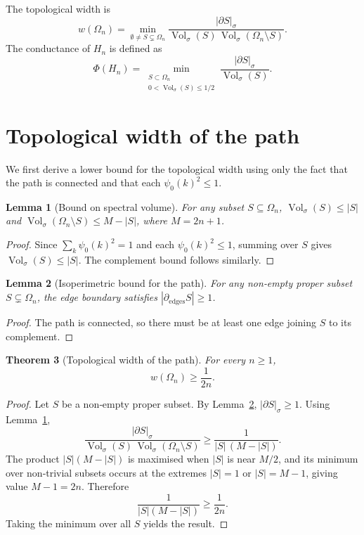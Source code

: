 \documentclass[11pt,a4paper]{article}
\newtheorem{theorem}{Theorem}[section]
\newtheorem{lemma}[theorem]{Lemma}
\begin{document}
The topological width is
\[
w(\Omega_n) = \min_{\emptyset\neq S\subsetneq\Omega_n} \frac{|\partial S|_\sigma}{\operatorname{Vol}_\sigma(S)\,\operatorname{Vol}_\sigma(\Omega_n\setminus S)}.
\]
The conductance of $H_n$ is defined as
\[
\Phi(H_n) = \min_{\substack{S\subset\Omega_n\\0<\operatorname{Vol}_\sigma(S)\le 1/2}} \frac{|\partial S|_\sigma}{\operatorname{Vol}_\sigma(S)}.
\]

\section{Topological width of the path}

We first derive a lower bound for the topological width using only the fact that the path is connected and that each $\psi_0(k)^2 \le 1$.

\begin{lemma}[Bound on spectral volume]\label{lem:vol}
For any subset $S\subseteq\Omega_n$, $\operatorname{Vol}_\sigma(S) \le |S|$ and $\operatorname{Vol}_\sigma(\Omega_n\setminus S) \le M - |S|$, where $M = 2n+1$.
\end{lemma}
\begin{proof}
Since $\sum_k \psi_0(k)^2 = 1$ and each $\psi_0(k)^2 \le 1$, summing over $S$ gives $\operatorname{Vol}_\sigma(S) \le |S|$. The complement bound follows similarly.
\end{proof}

\begin{lemma}[Isoperimetric bound for the path]\label{lem:isoperimetric}
For any non‑empty proper subset $S\subsetneq\Omega_n$, the edge boundary satisfies $|\partial_{\mathrm{edges}} S| \ge 1$.
\end{lemma}
\begin{proof}
The path is connected, so there must be at least one edge joining $S$ to its complement.
\end{proof}

\begin{theorem}[Topological width of the path]\label{thm:width}
For every $n\ge 1$,
\[
w(\Omega_n) \ge \frac{1}{2n}.
\]
\end{theorem}
\begin{proof}
Let $S$ be a non‑empty proper subset. By Lemma~\ref{lem:isoperimetric}, $|\partial S|_\sigma \ge 1$. Using Lemma~\ref{lem:vol},
\[
\frac{|\partial S|_\sigma}{\operatorname{Vol}_\sigma(S)\,\operatorname{Vol}_\sigma(\Omega_n\setminus S)}
\ge \frac{1}{|S|\,(M-|S|)}.
\]
The product $|S|(M-|S|)$ is maximised when $|S|$ is near $M/2$, and its minimum over non‑trivial subsets occurs at the extremes $|S|=1$ or $|S|=M-1$, giving value $M-1 = 2n$. Therefore
\[
\frac{1}{|S|(M-|S|)} \ge \frac{1}{2n}.
\]
Taking the minimum over all $S$ yields the result.
\end{proof}
\end{document}
